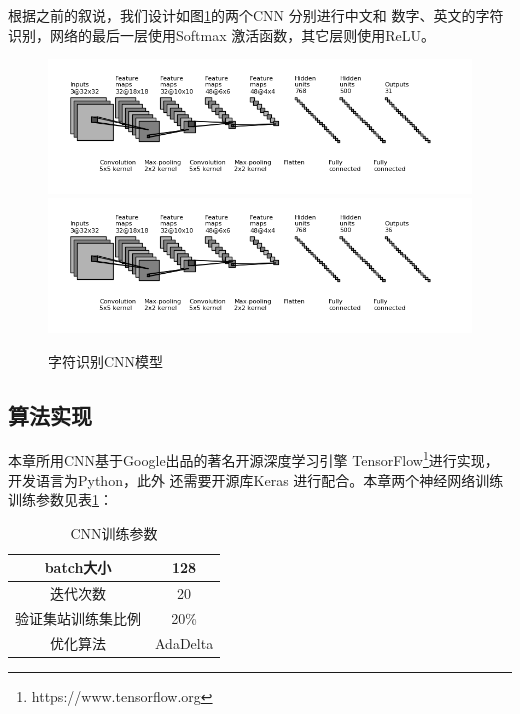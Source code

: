 根据之前的叙说，我们设计如图\ref{Fig:RecognitionCNN}的两个CNN 分别进行中文和
数字、英文的字符识别，网络的最后一层使用Softmax 激活函数，其它层则使用ReLU。

\begin{figure}[ht]
  \centering
  {\includegraphics[width=1.0\linewidth]{./Figure/RecognitionChinese.png}}
  {\includegraphics[width=1.0\linewidth]{./Figure/RecognitionAlnum.png}}
  \caption{字符识别CNN模型} \label{Fig:RecognitionCNN}
\end{figure}

\subsection{算法实现}

本章所用CNN基于Google出品的著名开源深度学习引擎
TensorFlow\footnote{https://www.tensorflow.org}进行实现，开发语言为Python，此外
还需要开源库Keras 进行配合。本章两个神经网络训练训练参数见表\ref{Tab:RecogCNNArgs}：

\begin{table}[ht]
\centering
\caption{CNN训练参数}\label{Tab:RecogCNNArgs}
\begin{tabular}{|c|c|}
\hline
  batch大小 & 128 \\
\hline
  迭代次数 & 20 \\
\hline
  验证集站训练集比例 & 20\% \\
\hline
  优化算法 & AdaDelta\cite{Zeiler:2012uw} \\
\hline
\end{tabular}
\end{table}

